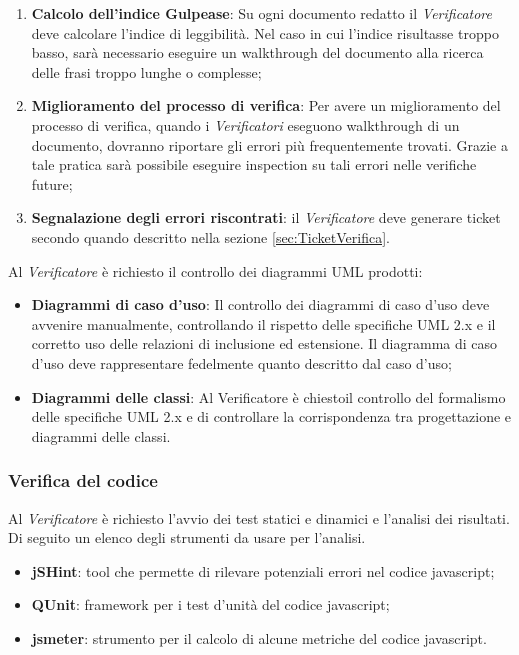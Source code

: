 {\begin{enumerate}
	\item \textbf{Calcolo dell’indice Gulpease}: Su ogni documento redatto il \emph{Verificatore} deve calcolare l’indice di leggibilità. Nel caso in cui l’indice risultasse troppo basso, sarà necessario eseguire un walkthrough del documento alla ricerca delle frasi troppo lunghe o complesse;
	\item \textbf{Miglioramento del processo di verifica}: Per avere un miglioramento del processo di verifica, quando i \emph{Verificatori} eseguono walkthrough di un documento, dovranno riportare gli errori più frequentemente trovati. Grazie a tale pratica sarà possibile eseguire inspection su tali errori nelle verifiche future;
	\item \textbf{Segnalazione degli errori riscontrati}: il \emph{Verificatore} deve generare ticket secondo quando descritto nella
	sezione \ref{sec:TicketVerifica}.
	\end{enumerate}
	\label{sec:strumentiVerifica}
Al \emph{Verificatore} è richiesto il controllo dei diagrammi UML prodotti:
\begin{itemize}

\item \textbf{Diagrammi di caso d’uso}: Il controllo dei diagrammi di caso d’uso deve avvenire manualmente, controllando il rispetto delle specifiche UML 2.x e il corretto uso delle relazioni di inclusione ed estensione. Il diagramma di caso d’uso deve rappresentare fedelmente quanto descritto dal caso d’uso;
\item \textbf{Diagrammi delle classi}: Al Verificatore è chiestoil controllo del formalismo delle specifiche UML 2.x e di controllare la corrispondenza tra progettazione e diagrammi delle classi.

\end{itemize}

	\subsubsection{Verifica del codice}
	Al \emph{Verificatore} è richiesto l’avvio dei test statici e dinamici e l’analisi dei risultati. Di seguito un elenco degli strumenti da usare per l’analisi.
	
	
	  \begin{itemize}
	  \item \textbf{jSHint}: tool che permette di rilevare potenziali errori nel codice javascript;
	  \item \textbf{QUnit}: framework per i test d'unità del codice javascript;
	  \item \textbf{jsmeter}: strumento per il calcolo di alcune metriche del codice javascript.
	  \end{itemize}
	
}
